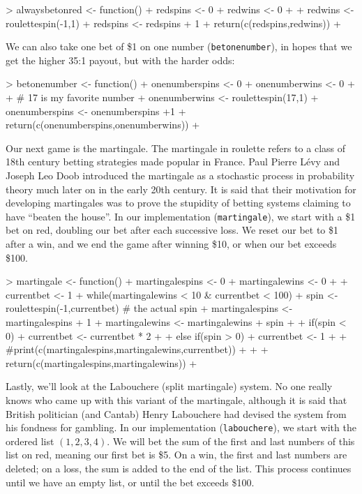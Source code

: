 \documentclass[9pt, oneside, reqno]{article}
\theoremstyle{plain}
\begin{document}
\begin{Schunk}
\begin{Sinput}
> alwaysbetonred <- function(){
+ 	redspins <- 0
+ 	redwins <- 0
+ 
+ 	redwins <- roulettespin(-1,1)
+ 	redspins <- redspins + 1
+ 	return(c(redspins,redwins))
+ 	}
\end{Sinput}
\end{Schunk}

We can also take one bet of \$1 on one number ({\tt betonenumber}), in hopes that we get the higher 35:1 payout, but with the harder odds:

\begin{Schunk}
\begin{Sinput}
> betonenumber <- function(){
+ 	onenumberspins <- 0
+ 	onenumberwins <- 0
+ 	
+ 	# 17 is my favorite number
+ 	onenumberwins <- roulettespin(17,1)
+ 	onenumberspins <- onenumberspins +1
+ 	return(c(onenumberspins,onenumberwins))
+ 	}
\end{Sinput}
\end{Schunk}

Our next game is the martingale. The martingale in roulette refers to a class of 18th century betting strategies made popular in France. Paul Pierre L\'{e}vy and Joseph Leo Doob introduced the martingale as a stochastic process in probability theory much later on in the early 20th century. It is said that their motivation for developing martingales was to prove the stupidity of betting systems claiming to have ``beaten the house''. In our implementation ({\tt martingale}), we start with a \$1 bet on red, doubling our bet after each successive loss. We reset our bet to \$1 after a win, and we end the game after winning \$10, or when our bet exceeds \$100.

\begin{Schunk}
\begin{Sinput}
> martingale <- function(){
+ 	martingalespins <- 0
+ 	martingalewins <- 0
+ 	
+ 	currentbet <- 1
+ 	while(martingalewins < 10 & currentbet < 100){
+ 		spin <- roulettespin(-1,currentbet) # the actual spin
+ 		martingalespins <- martingalespins + 1
+ 		martingalewins <- martingalewins + spin
+ 		
+ 		if(spin < 0){
+ 			currentbet <- currentbet * 2}
+ 			
+ 		else if(spin > 0){
+ 			currentbet <- 1}
+ 		
+ 		#print(c(martingalespins,martingalewins,currentbet))
+ 		}
+ 		
+ 	return(c(martingalespins,martingalewins))
+ 	}
\end{Sinput}
\end{Schunk}

Lastly, we'll look at the Labouchere (split martingale) system. No one really knows who came up with this variant of the martingale, although it is said that British politician (and Cantab) Henry Labouchere had devised the system from his fondness for gambling. In our implementation ({\tt labouchere}), we start with the ordered list $(1,2,3,4)$. We will bet the sum of the first and last numbers of this list on red, meaning our first bet is \$5. On a win, the first and last numbers are deleted; on a loss, the sum is added to the end of the list. This process continues until we have an empty list, or until the bet exceeds \$100.
\end{document}
